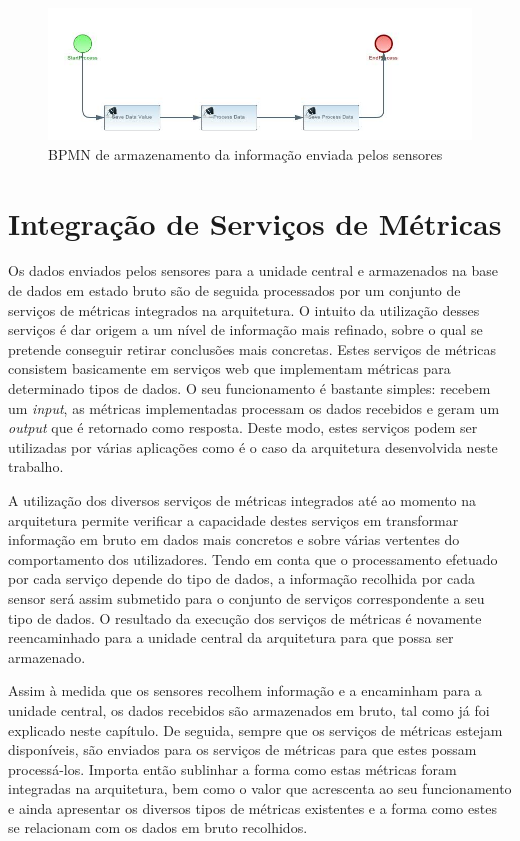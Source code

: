 \begin{figure}[htb]
   \centering
   \includegraphics[scale=0.6]{Images/SaveDataComponent.jpg}
   \caption{BPMN de armazenamento da informação enviada pelos sensores}
\end{figure}

\section{Integração de Serviços de Métricas}

Os dados enviados pelos sensores para a unidade central e armazenados na base de dados em estado bruto são de seguida processados por um conjunto de serviços de métricas integrados na arquitetura. O intuito da utilização desses serviços é dar origem a um nível de informação mais refinado, sobre o qual se pretende conseguir retirar conclusões mais concretas. Estes serviços de métricas consistem basicamente em serviços web que implementam métricas para determinado tipos de dados. O seu funcionamento é bastante simples: recebem um \textit{input}, as métricas implementadas processam os dados recebidos e geram um \textit{output} que é retornado como resposta. Deste modo, estes serviços podem ser utilizadas por várias aplicações como é o caso da arquitetura desenvolvida neste trabalho.

A utilização dos diversos serviços de métricas integrados até ao momento na arquitetura permite verificar a capacidade destes serviços em transformar informação em bruto em dados mais concretos e sobre várias vertentes do comportamento dos utilizadores. Tendo em conta que o processamento efetuado por cada serviço depende do tipo de dados, a informação recolhida por cada sensor será assim submetido para o conjunto de serviços correspondente a seu tipo de dados. O resultado da execução dos serviços de métricas é novamente reencaminhado para a unidade central da arquitetura para que possa ser armazenado.

Assim à medida que os sensores recolhem informação e a encaminham para a unidade central, os dados recebidos são armazenados em bruto, tal como já foi explicado neste capítulo. De seguida, sempre que os serviços de métricas estejam disponíveis, são enviados para os serviços de métricas para que estes possam processá-los. Importa então sublinhar a forma como estas métricas foram integradas na arquitetura, bem como o valor que acrescenta ao seu funcionamento e ainda apresentar os diversos tipos de métricas existentes e a forma como estes se relacionam com os dados em bruto recolhidos.

